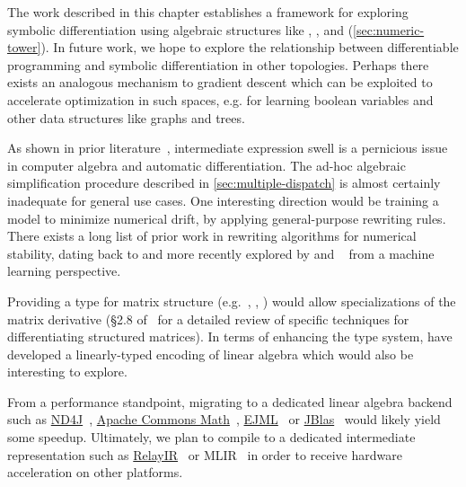 The work described in this chapter establishes a framework for exploring symbolic differentiation using algebraic structures like , , and  (\autoref{sec:numeric-tower}). In future work, we hope to explore the relationship between differentiable programming and symbolic differentiation in other topologies. Perhaps there exists an analogous mechanism to gradient descent which can be exploited to accelerate optimization in such spaces, e.g. for learning boolean variables and other data structures like graphs and trees.

As shown in prior literature~\citep{bergstra2010theano, baydin2015survey, laue2019equivalence}, intermediate expression swell is a pernicious issue in computer algebra and automatic differentiation. The ad-hoc algebraic simplification procedure described in \autoref{sec:multiple-dispatch} is almost certainly inadequate for general use cases. One interesting direction would be training a model to minimize numerical drift, by applying general-purpose rewriting rules. There exists a long list of prior work in rewriting algorithms for numerical stability, dating back to \citet{kahan1965summation, dekker1971floating, ogita2005accurate} and more recently explored by \citet{zaremba2014learning, zaremba2016learning} and ~\citet{wang2019global} from a machine learning perspective.

Providing a type for matrix structure (e.g.\ , , ) would allow specializations of the matrix derivative (\S 2.8 of~\citet{petersen2012matrix} for a detailed review of specific techniques for differentiating structured matrices). In terms of enhancing the type system, \citet{makwana2018numlin} have developed a linearly-typed encoding of linear algebra which would also be interesting to explore.

From a performance standpoint, migrating to a dedicated linear algebra backend such as \href{https://deeplearning4j.org/docs/latest/nd4j-overview}{ND4J}~\citep{team2016nd4j}, \href{https://commons.apache.org/proper/commons-math/}{Apache Commons Math}~\citep{developers2012apache}, \href{http://ejml.org}{EJML}~\citep{abeles2010efficient} or \href{http://jblas.org/}{JBlas}~\citep{braun2011jblas} would likely yield some speedup. Ultimately, we plan to compile to a dedicated intermediate representation such as \href{https://docs.tvm.ai/dev/relay_intro.html}{RelayIR}~\citep{roesch2018relay} or MLIR~\citep{mlir} in order to receive hardware acceleration on other platforms.

